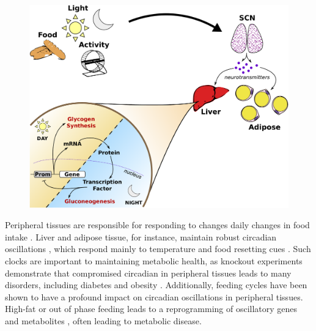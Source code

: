 \begin{figure}[tbp]
  \centering
  \includegraphics[width=\textwidth]{chap1/figures/timescale_separation.pdf}
  \label{fig:feedforward}
\end{figure}

Peripheral tissues are responsible for responding to changes daily changes in food intake \cite{Bass2010}. 
Liver and adipose tissue, for instance, maintain robust circadian oscillations \cite{Yoo2004}, which respond mainly to temperature and food resetting cues \cite{Yamazaki2000a}.
Such clocks are important to maintaining metabolic health, as knockout experiments demonstrate that compromised circadian in peripheral tissues leads to many disorders, including diabetes and obesity \cite{Marcheva2010, Shi2013}.
Additionally, feeding cycles have been shown to have a profound impact on  circadian oscillations in peripheral tissues. High-fat or out of phase feeding leads to a reprogramming of oscillatory genes and metabolites 
\cite{Kohsaka2007, Hatori2012}, often leading to metabolic disease.

